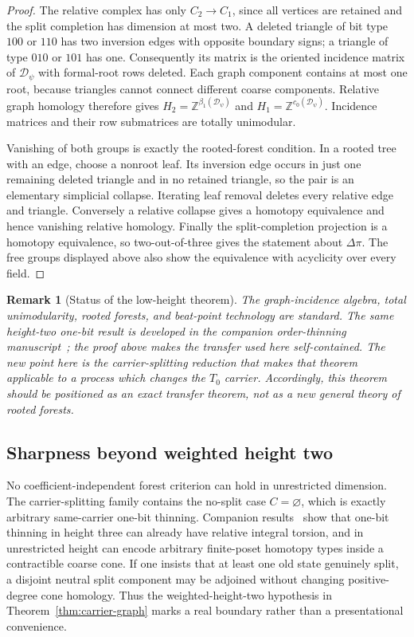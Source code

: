 \documentclass[11pt]{article}
\newtheorem{remark}[theorem]{Remark}
\begin{document}
\begin{proof}
The relative complex has only $C_2\to C_1$, since all vertices are retained
and the split completion has dimension at most two.  A deleted triangle of
bit type $100$ or $110$ has two inversion edges with opposite boundary signs;
a triangle of type $010$ or $101$ has one.  Consequently its matrix is the
oriented incidence matrix of $\mathcal D_\psi$ with formal-root rows deleted.
Each graph component contains at most one root, because triangles cannot
connect different coarse components.  Relative graph homology therefore gives
$H_2=\mathbb Z^{\beta_1(\mathcal D_\psi)}$ and
$H_1=\mathbb Z^{c_0(\mathcal D_\psi)}$.  Incidence matrices and their row
submatrices are totally unimodular.

Vanishing of both groups is exactly the rooted-forest condition.  In a rooted
tree with an edge, choose a nonroot leaf.  Its inversion edge occurs in just
one remaining deleted triangle and in no retained triangle, so the pair is
an elementary simplicial collapse.  Iterating leaf removal deletes every
relative edge and triangle.  Conversely a relative collapse gives a homotopy
equivalence and hence vanishing relative homology.  Finally the split-completion
projection is a homotopy equivalence, so two-out-of-three gives the statement
about $\Delta\pi$.  The free groups displayed above also show the equivalence
with acyclicity over every field.
\end{proof}

\begin{remark}[Status of the low-height theorem]
The graph-incidence algebra, total unimodularity, rooted forests, and beat-point
technology are standard.  The same height-two one-bit result is developed in the companion
order-thinning manuscript~\cite{DroncheffThinning2026}; the proof above makes
the transfer used here self-contained.  The new point here is the
carrier-splitting reduction that makes that theorem applicable to a process which
changes the $T_0$ carrier.  Accordingly, this theorem should be positioned as an
exact transfer theorem, not as a new general theory of rooted forests.
\end{remark}

\subsection{Sharpness beyond weighted height two}

No coefficient-independent forest criterion can hold in unrestricted dimension.
The carrier-splitting family contains the no-split case $C=\varnothing$, which is
exactly arbitrary same-carrier one-bit thinning.  Companion results~\cite{DroncheffThinning2026} show that one-bit
thinning in height three can already have relative integral torsion, and in unrestricted
height can encode arbitrary finite-poset homotopy types inside a contractible coarse
cone.  If one insists that at least one old state genuinely split, a disjoint neutral
split component may be adjoined without changing positive-degree cone homology.
Thus the weighted-height-two hypothesis in Theorem~\ref{thm:carrier-graph} marks a
real boundary rather than a presentational convenience.
\end{document}
